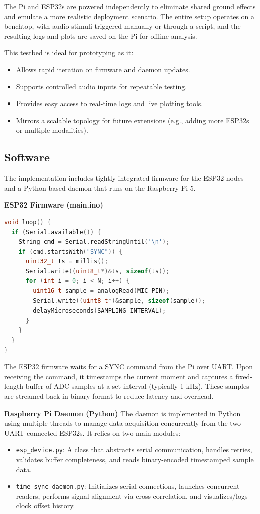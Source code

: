 \documentclass[sigconf]{acmart}
\begin{document}
The Pi and ESP32s are powered independently to eliminate shared ground effects and emulate a more realistic deployment scenario. The entire setup operates on a benchtop, with audio stimuli triggered manually or through a script, and the resulting logs and plots are saved on the Pi for offline analysis.

This testbed is ideal for prototyping as it:
\begin{itemize}
    \item Allows rapid iteration on firmware and daemon updates.
    \item Supports controlled audio inputs for repeatable testing.
    \item Provides easy access to real-time logs and live plotting tools.
    \item Mirrors a scalable topology for future extensions (e.g., adding more ESP32s or multiple modalities).
\end{itemize}

\subsection{Software}

The implementation includes tightly integrated firmware for the ESP32 nodes and a Python-based daemon that runs on the Raspberry Pi 5.

\textbf{ESP32 Firmware (main.ino)}
\begin{lstlisting}[language=C++,caption=ESP32 sampling loop]
void loop() {
  if (Serial.available()) {
    String cmd = Serial.readStringUntil('\n');
    if (cmd.startsWith("SYNC")) {
      uint32_t ts = millis();
      Serial.write((uint8_t*)&ts, sizeof(ts));
      for (int i = 0; i < N; i++) {
        uint16_t sample = analogRead(MIC_PIN);
        Serial.write((uint8_t*)&sample, sizeof(sample));
        delayMicroseconds(SAMPLING_INTERVAL);
      }
    }
  }
}
\end{lstlisting}

The ESP32 firmware waits for a SYNC command from the Pi over UART. Upon receiving the command, it timestamps the current moment and captures a fixed-length buffer of ADC samples at a set interval (typically 1 kHz). These samples are streamed back in binary format to reduce latency and overhead.

\textbf{Raspberry Pi Daemon (Python)}
The daemon is implemented in Python using multiple threads to manage data acquisition concurrently from the two UART-connected ESP32s. It relies on two main modules:
\begin{itemize}
    \item \texttt{esp\_device.py}: A class that abstracts serial communication, handles retries, validates buffer completeness, and reads binary-encoded timestamped sample data.
    \item \texttt{time\_sync\_daemon.py}: Initializes serial connections, launches concurrent readers, performs signal alignment via cross-correlation, and visualizes/logs clock offset history.
\end{itemize}
\end{document}

